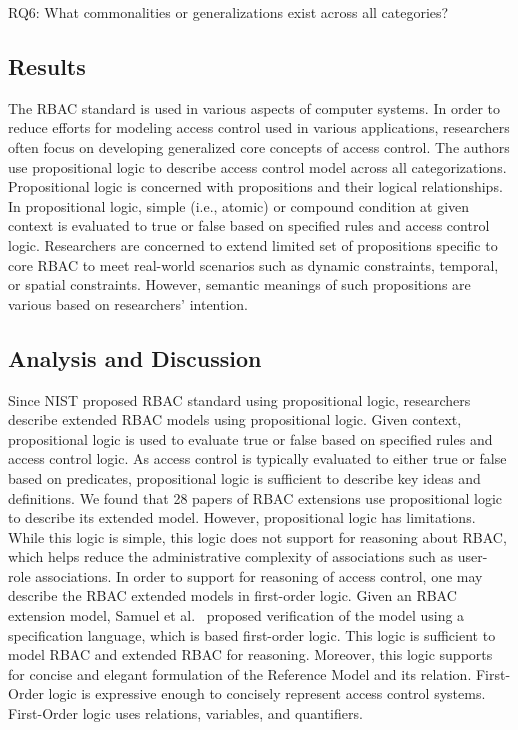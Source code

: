 RQ6: What commonalities or generalizations exist across all categories?

\subsection{Results}

The RBAC standard is used in various aspects of computer systems. In order to reduce efforts for modeling access control used in various applications, researchers often focus on developing generalized core concepts of access control.
The authors use propositional logic to describe access control model across all categorizations. Propositional logic is concerned with propositions and their logical relationships. In propositional logic, simple (i.e., atomic) or compound condition at given context is evaluated to true or false based on specified rules and access control logic. Researchers are concerned to extend limited set of propositions specific to core RBAC to meet real-world scenarios such as dynamic constraints, temporal, or spatial constraints. However, semantic meanings of such propositions are various based on researchers' intention.

\subsection{Analysis and Discussion}

Since NIST proposed RBAC standard using propositional logic, researchers describe extended RBAC models using propositional logic. Given context, propositional logic is used to evaluate true or false based on specified rules and access control logic. As access control is typically evaluated to either true or false based on predicates, propositional logic is sufficient to describe key ideas and definitions. We found that 28 papers of RBAC extensions use propositional logic to describe its extended model.
However, propositional logic has limitations. While this logic is simple, this logic does not support for reasoning about RBAC, which helps
reduce the administrative complexity of associations such as user- role associations.
In order to support for reasoning of access control, one may describe the RBAC extended models in first-order logic. 
Given an RBAC extension model, Samuel et al.~\cite{samuel07:spatio-temporal} proposed verification of the model using a specification language, which is based first-order logic. This logic is sufficient to model RBAC and extended RBAC for reasoning. Moreover, this logic supports for concise and elegant formulation of the Reference Model and its relation.  First-Order logic is expressive enough to concisely represent access control systems. First-Order logic uses relations, variables, and quantifiers.
